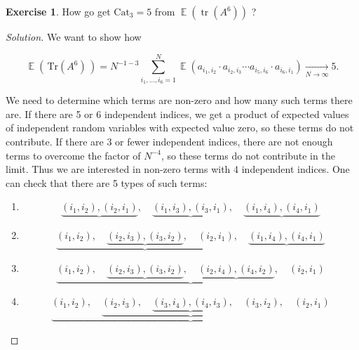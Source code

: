 \documentclass[letterpaper,11pt,oneside,reqno]{amsart}
\numberwithin{equation}{section}
\DeclareMathOperator{\EE}{\mathbb{E}}
\theoremstyle{definition}
\newtheorem{exercise}[proposition]{Exercise}
\begin{document}
\begin{exercise}
How go get $ \mathrm{Cat}_3 = 5 $ from $ \EE(\mathop{\mathrm{tr}}( A^6 ) )$ ?
\end{exercise}
\begin{proof}[Solution]
	We want to show how

	\begin{equation*}
	\EE( \, \text{Tr}( A^6 ) \, ) = N^{ -1 - 3 } \sum_{ i_1 , \ldots, i_6 = 1 }^N \EE \left( a_{ i_1, i_2 } \cdot a_{ i_2, i_3 } \cdots a_{ i_5, i_6 } \cdot a_{ i_6, i_1 } \right) \xrightarrow[ N \to \infty ]{} 5.
	\end{equation*}

	We need to determine which terms are non-zero and how many such terms there are.  If there are 5 or 6 independent indices, we get a product of expected values of independent random variables with expected value zero, so these terms do not contribute.  If there are 3 or fewer independent indices, there are not enough terms to overcome the factor of $ N^{ -4 } $, so these terms do not contribute in the limit.  Thus we are interested in non-zero terms with 4 independent indices.
	One can check that there are 5 types of such terms:

	\begin{enumerate}

	\item
	\begin{equation*}
	\underbrace{ ( i_1, i_2 ) , ( i_2 , i_1 ) }, \quad \underbrace{ ( i_1, i_3 ) , ( i_3, i_1 ) }, \quad \underbrace{ ( i_1, i_4 ), ( i_4, i_1 ) }
	\end{equation*}

	\item
	\begin{equation*}
	\underbrace{ ( i_1, i_2 ) , \quad \underbrace{ ( i_2 , i_3 ) , ( i_3, i_2 ) } , \quad ( i_2, i_1 ) } , \quad \underbrace{ ( i_1, i_4 ), ( i_4, i_1 ) }
	\end{equation*}

	\item
	\begin{equation*}
	\underbrace{ ( i_1, i_2 ) , \quad \underbrace{ ( i_2 , i_3 ) , ( i_3, i_2 ) } , \quad \underbrace{ ( i_2, i_4 ) , ( i_4, i_2 ) }, \quad ( i_2, i_1 ) } 
	\end{equation*}

	\item
	\begin{equation*}
	\underbrace{ ( i_1, i_2 ) , \quad \underbrace{ ( i_2 , i_3 ) , \quad \underbrace{ ( i_3, i_4 ) , ( i_4, i_3 ) }, \quad ( i_3, i_2 ) } , \quad ( i_2, i_1 ) } 
	\end{equation*}


\end{enumerate}
\end{proof}
\end{document}
